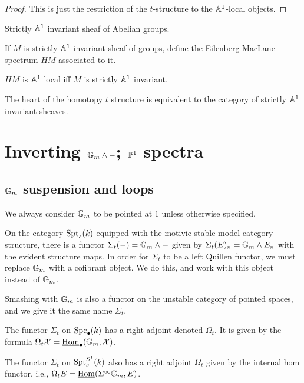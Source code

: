 \documentclass{amsart}%
\begin{document}
\begin{proof}
  This is just the restriction of the $t$-structure to the
  $\mathbb{A}^1$-local objects.
\end{proof}

\begin{definition}
  Strictly $\mathbb{A}^1$ invariant sheaf of Abelian groups.

  If $M$ is strictly $\mathbb{A}^1$ invariant sheaf of groups, define the
  Eilenberg-MacLane spectrum $HM$ associated to it. 
\end{definition}

\begin{proposition}
  $HM$ is $\mathbb{A}^1$ local iff $M$ is strictly $\mathbb{A}^1$ invariant.
\end{proposition}

\begin{proposition}
  The heart of the homotopy $t$ structure is equivalent to the
  category of strictly $\mathbb{A}^1$ invariant sheaves.
\end{proposition}

\section{Inverting $\mathbb{G}_m\wedge -$; $\mathbb{P}^1$ spectra}

\subsection{$\mathbb{G}_m$ suspension and loops}

We always consider $\mathbb{G}_m$ to be pointed at $1$ unless otherwise
specified.

\begin{definition}
  On the category $\mathrm{Spt}_s(k)$ equipped with the motivic stable model
  category structure, there is a functor
  $\Sigma_t(-) = \mathbb{G}_m \wedge -$ given by
  $\Sigma_t(E)_n = \mathbb{G}_m \wedge E_n$ with the evident structure
  maps. In order for $\Sigma_t$ to be a left Quillen functor, we must
  replace $\mathbb{G}_m$ with a cofibrant object. We do this, and work with
  this object instead of $\mathbb{G}_m$.

  Smashing with $\mathbb{G}_m$ is also a functor on the unstable category of
  pointed spaces, and we give it the same name $\Sigma_t$.
\end{definition}

\begin{definition}
  The functor $\Sigma_t$ on $\mathrm{Spc}_{\bullet}(k)$ has a right adjoint
  denoted $\Omega_t$. It is given by the formula
  $\Omega_t\mathcal{X} = \underline{\operatorname{Hom}}_{\bullet}(\mathbb{G}_m,\mathcal{X})$.

  The functor $\Sigma_t$ on $\mathrm{Spt}_s^{S^1}(k)$ also has a right adjoint
  $\Omega_t$ given by the internal hom functor, i.e.,
  $\Omega_tE = \underline{\operatorname{Hom}}(\Sigma^{\infty}\mathbb{G}_{m}, E)$.
\end{definition}
\end{document}
